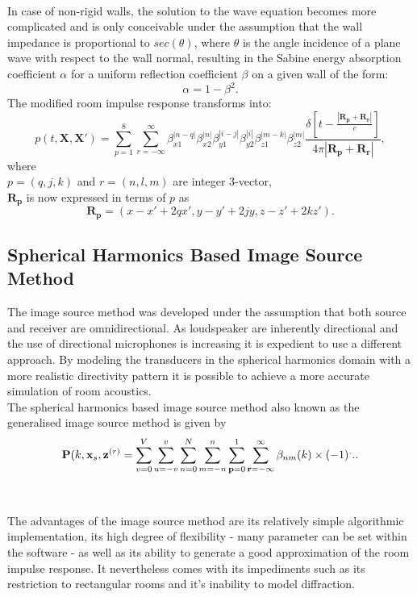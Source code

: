 \\
In case of non-rigid walls, the solution to the wave equation becomes more complicated and is only conceivable under the assumption that the wall impedance is proportional to $sec(\theta)$, where $\theta$ is the angle incidence of a plane wave with respect to the wall normal, resulting in the Sabine energy absorption coefficient $\alpha$ for a uniform reflection coefficient $\beta$ on a given wall of the form\cite{Allen1979}:
\begin{equation}
    \alpha=1-\beta^2.
\end{equation}
The modified room impulse response transforms into:
\begin{equation}
    p(t,\mathbf{X},\mathbf{X'})=\sum_{p=1}^8\sum_{r=-\infty}^\infty
    \beta_{x1}^{|n-q|}\beta_{x2}^{|n|}\beta_{y1}^{|i-j|}\beta_{y2}^{|i|}\beta_{z1}^{|m-k|}\beta_{z2}^{|m|}
    \frac{\delta[t-\frac{|\mathbf{R_p}+\mathbf{R_r}|}{c}]}{4\pi|\mathbf{R_p}+\mathbf{R_r}|},
\end{equation}
where\\
$p=(q,j,k)$ and $r=(n,l,m)$ are integer 3-vector,\\
$\mathbf{R_p}$ is now expressed in terms of $p$ as
\begin{equation}
    \mathbf{R_p}=(x-x'+2qx', y-y'+2jy,z-z'+2kz').
\end{equation}


\subsection{Spherical Harmonics Based Image Source Method}
The image source method was developed under the assumption that both source and receiver are omnidirectional. As loudspeaker are inherently directional and the use of directional microphones is increasing it is expedient to use a different approach. By modeling the transducers in the spherical harmonics domain with a more realistic directivity pattern it is possible to achieve a more accurate simulation of room acoustics.\cite{Samarasinghe2018}\\
The spherical harmonics based image source method also known as the generalised image source method is given by
\begin{equation}
    \mathbf{P}(k,\mathbf{x}_s,\mathbf{z}^{(r)} = \sum_{v=0}^V\sum_{u=-v}^v\sum_{n=0}^N\sum_{m=-n}^n\sum_{\mathbf{p}=0}^1\sum_{\mathbf{r}=-\infty}^\infty\beta_{nm}(k)\\
    \times (-1)^...
\end{equation}
\\
\\The advantages of the image source method are its relatively simple algorithmic implementation, its high degree of flexibility - many parameter can be set within the software - as well as its ability to generate a good approximation of the room impulse response. It nevertheless comes with its impediments such as its restriction to rectangular rooms and it's inability to model diffraction.\cite{Samarasinghe2018}